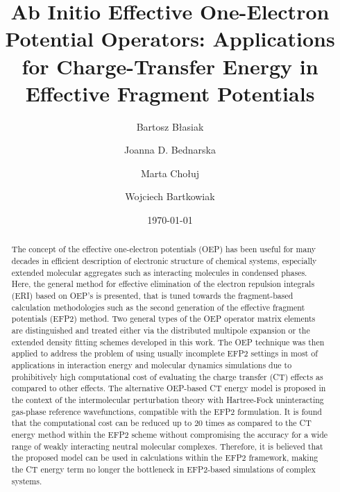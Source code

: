 


\title{Ab Initio Effective One-Electron Potential Operators:
Applications for Charge-Transfer Energy in Effective Fragment Potentials}

\author{Bartosz B{\l}asiak}

\author{Joanna D. Bednarska}
\author{Marta Cho{\l}uj} 
\author{Wojciech Bartkowiak}


\date{\today}

\begin{abstract}
The concept of the effective one\hyp{}electron potentials (OEP) has been useful for many decades
in efficient description of electronic structure of chemical systems, especially extended
molecular aggregates such as interacting molecules in condensed phases.
Here, the general method for effective elimination of the electron repulsion integrals (ERI)
based on OEP's is presented, that is tuned towards the fragment\hyp{}based calculation methodologies
such as the second generation of the effective fragment potentials (EFP2) method. 
Two general types of the OEP operator matrix elements
are distinguished and treated either via the distributed multipole expansion
or the extended density fitting schemes developed in this work. 
The OEP technique was then applied
to address the problem of using usually incomplete EFP2 settings in most of
applications in interaction energy and 
molecular dynamics simulations 
due to prohibitively high computational cost of evaluating the
charge transfer (CT) effects as compared to other effects.
The alternative OEP\hyp{}based CT energy model is proposed
in the context of the
intermolecular perturbation theory with Hartree\hyp{}Fock uninteracting gas\hyp{}phase 
reference wavefunctions, compatible with the EFP2 formulation.
It is found that the computational cost can be reduced
up to 20 times as compared to the CT energy method within the EFP2 scheme
without compromising the accuracy for a wide range of weakly interacting 
neutral molecular complexes. 
Therefore, it is believed that
the proposed model can be used in calculations within 
the EFP2 framework, making the CT energy term no longer the bottleneck
in EFP2\hyp{}based simulations of complex systems.
\end{abstract}

